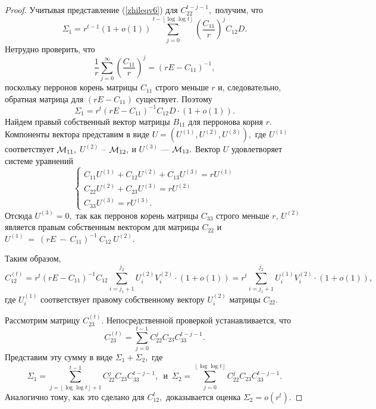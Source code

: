 \documentclass[10pt]{article}
\begin{document}
\begin{proof}
Учитывая представление (\ref{zhileqv6}) для $C_{22}^{t-j-1},$ получим, что
$$
\Sigma_1 = r^{t-1}(1+o(1))\sum_{j=0}^{t-\left\lfloor \log \log t\right\rfloor}\left(\frac{C_{11}}{r}\right)^{j}C_{12} D. 
$$
Нетрудно проверить, что 
$$
\frac{1}{r}\sum_{j=0}^{\infty}\left(\frac{C_{11}}{r}\right)^{j}=(rE-C_{11})^{-1},
$$
поскольку перронов корень матрицы $C_{11}$ строго меньше $r$ и, следовательно, обратная матрица для $(rE-C_{11})$ существует.
Поэтому
$$
\Sigma_1 =  r^{t}(rE-C_{11})^{-1}C_{12}D\cdot(1+o(1)). 
$$
Найдем правый собственный вектор матрицы $B_{11}$ для перронова корня $r.$
Компоненты вектора представим в виде $U=(U^{(1)},U^{(2)},U^{(3)}),$ где $U^{(1)}$ соответствует ${\cal M}_{11},$ $U^{(2)}$ -- ${\cal M}_{12},$ и $U^{(3)}$ --- ${\cal M}_{13}.$ Вектор $U$ удовлетворяет системе уравнений
$$
\left\{
\begin{array}{l}
C_{11}U^{(1)}+ C_{12}U^{(2)}+C_{13}U^{(3)}=r U^{(1)}\\
C_{22}U^{(2)}+C_{23}U^{(3)}=r U^{(2)}\\
C_{33}U^{(3)}=r U^{(3)}.
\end{array}
\right.
$$
Отсюда $U^{(3)}=0,$ так как перронов корень матрицы $C_{33}$ строго меньше $r$, $U^{(2)}$ является правым собственным вектором для матрицы $C_{22}$ и $U^{(1)}~=~(rE~-~C_{11})^{-1}~C_{12}~U^{(2)}.$ 

Таким образом, 
$$
C_{12}^{(t)}=r^{t}(rE-C_{11})^{-1}C_{12}\sum^{j_2}_{i=j_1+1}U_i^{(2)}V_i^{(2)}\cdot(1+o(1))=r^{t}\sum^{j_2}_{i=j_1+1}U_i^{(1)}V_i^{(2)}\cdot(1+o(1)),
$$
где $U_i^{(1)}$ соответствует правому собственному вектору $U_i^{(2)}$ матрицы $C_{22}.$ 

Рассмотрим матрицу $C_{23}^{(t)}.$ Непосредственной проверкой устанавливается, что
$$
C_{23}^{(t)}=\sum_{j=0}^{t-1}C_{22}^{j}C_{23} C_{33}^{t-j-1}.
$$
Представим эту сумму в виде $\Sigma_1+\Sigma_2,$
где $$
\Sigma_1=\sum_{j=\left\lfloor \log \log t\right\rfloor+1}^{t-1}C_{22}^{j}C_{23} C_{33}^{t-j-1}, \, \,\, \mbox{и} \,\,\,
\Sigma_2=\sum_{j=0}^{\left\lfloor \log \log t\right\rfloor}C_{22}^{j}C_{23} C_{33}^{t-j-1}.
$$
Аналогично тому, как это сделано для $C_{12}^t,$ доказывается оценка $\Sigma_2=o(r^t).$


\end{proof}
\end{document}
